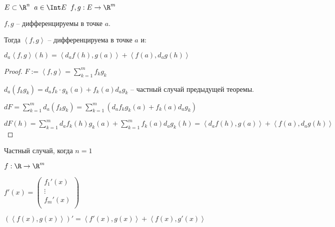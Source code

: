 \begin{theorem}\slashns
    
    $E\subset \R^n \;\; a\in \Int E \;\; f,g : E \to \R^m$
    
    $f,g$ -- дифференцируемы в точке $a$.
    
    Тогда $\left<f,g \right>$ -- дифференцируема в точке $a$ и:
    
    $d_a\left<f,g\right> (h) = \left<d_a f(h), g(a)\right> + \left<f(a), d_a g(h)\right>$
    
    
\end{theorem}

\begin{proof}\slashns
    
    $F:= \left<f,g\right> = \sum\limits_{k = 1}^{m} f_k g_k$
    
    $d_a(f_k g_k) = d_a f_k \cdot g_k(a) + f_k(a) d_a g_k$ -- частный случай предыдущей теоремы.
    
    $dF = \sum\limits_{k = 1}^{m} d_a(f_k g_k) = \sum\limits_{k = 1}^{m} (d_a f_k g_k(a) + f_k(a) d_a g_k)$
    
    $dF(h) = \sum\limits_{k = 1}^{m}d_a f_k(h) g_k(a)+\sum\limits_{k = 1}^{m} f_k(a) d_ag_k(h) =  \left<d_a f(h), g(a)\right> + \left<f(a), d_a g(h)\right>$
\end{proof}

\begin{remark}\slashns
    
    Частный случай, когда $n = 1$
    
    $f: \R \to \R^m$
    
    $f'(x) = \begin{pmatrix}
    f_1'(x)\\\vdots\\f_m'(x)\\
    \end{pmatrix}$
    
    $(\left< f(x), g(x) \right> )' = \left<f'(x), g(x)\right> + \left<f(x), g'(x)\right>$
\end{remark}
